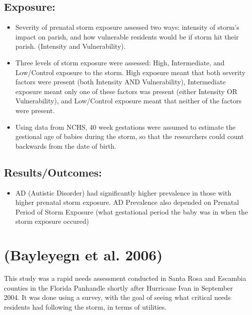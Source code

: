 \documentclass[
]{article}
\providecommand{\tightlist}{%
  \setlength{\itemsep}{0pt}\setlength{\parskip}{0pt}}
\begin{document}
\hypertarget{exposure}{%
\subsection{Exposure:}\label{exposure}}

\begin{itemize}
\tightlist
\item
  Severity of prenatal storm exposure assessed two ways: intensity of
  storm's impact on parish, and how vulnerable residents would be if
  storm hit their parish. (Intensity and Vulnerability).
\item
  Three levels of storm exposure were assessed: High, Intermediate, and
  Low/Control exposure to the storm. High exposure meant that both
  severity factors were present (both Intensity AND Vulnerability),
  Intermediate exposure meant only one of these factors was present
  (either Intensity OR Vulnerability), and Low/Control exposure meant
  that neither of the factors were present.
\item
  Using data from NCHS, 40 week gestations were assumed to estimate the
  gestional age of babies during the storm, so that the researchers
  could count backwards from the date of birth.
\end{itemize}

\hypertarget{resultsoutcomes}{%
\subsection{Results/Outcomes:}\label{resultsoutcomes}}

\begin{itemize}
\tightlist
\item
  AD (Autistic Disorder) had significantly higher prevalence in those
  with higher prenatal storm exposure. AD Prevalence also depended on
  Prenatal Period of Storm Exposure (what gestational period the baby
  was in when the storm exposure occured)
\end{itemize}

\hypertarget{bayleyegn2006rapid}{%
\section{(Bayleyegn et al. 2006)}\label{bayleyegn2006rapid}}

This study was a rapid needs assessment conducted in Santa Rosa and
Escambia counties in the Florida Panhandle shortly after Hurricane Ivan
in September 2004. It was done using a survey, with the goal of seeing
what critical needs residents had following the storm, in terms of
utilities.
\end{document}

